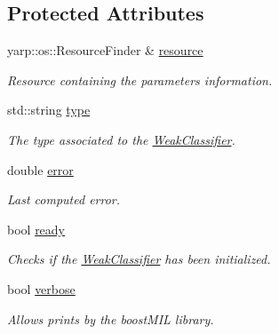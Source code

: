 \subsection*{Protected Attributes}
\begin{DoxyCompactItemize}
\item 
yarp\+::os\+::\+Resource\+Finder \& \hyperlink{classiCub_1_1boostMIL_1_1WeakClassifier_a5a7df0cc2cbb505e5b40dd59d3a4933b}{resource}\label{classiCub_1_1boostMIL_1_1WeakClassifier_a5a7df0cc2cbb505e5b40dd59d3a4933b}

\begin{DoxyCompactList}\small\item\em Resource containing the parameters information. \end{DoxyCompactList}\item 
std\+::string \hyperlink{classiCub_1_1boostMIL_1_1WeakClassifier_a6e08c26ea2e12086317d6cdd0f65bbd9}{type}\label{classiCub_1_1boostMIL_1_1WeakClassifier_a6e08c26ea2e12086317d6cdd0f65bbd9}

\begin{DoxyCompactList}\small\item\em The type associated to the \hyperlink{classiCub_1_1boostMIL_1_1WeakClassifier}{Weak\+Classifier}. \end{DoxyCompactList}\item 
double \hyperlink{classiCub_1_1boostMIL_1_1WeakClassifier_afa9e7bb9b9a92d349b40a4f127386a59}{error}\label{classiCub_1_1boostMIL_1_1WeakClassifier_afa9e7bb9b9a92d349b40a4f127386a59}

\begin{DoxyCompactList}\small\item\em Last computed error. \end{DoxyCompactList}\item 
bool \hyperlink{classiCub_1_1boostMIL_1_1WeakClassifier_a7fe5fe3366a82def4031c16a9a278350}{ready}\label{classiCub_1_1boostMIL_1_1WeakClassifier_a7fe5fe3366a82def4031c16a9a278350}

\begin{DoxyCompactList}\small\item\em Checks if the \hyperlink{classiCub_1_1boostMIL_1_1WeakClassifier}{Weak\+Classifier} has been initialized. \end{DoxyCompactList}\item 
bool \hyperlink{classiCub_1_1boostMIL_1_1WeakClassifier_a63a5602437f6936da17e33ca4d89976a}{verbose}\label{classiCub_1_1boostMIL_1_1WeakClassifier_a63a5602437f6936da17e33ca4d89976a}

\begin{DoxyCompactList}\small\item\em Allows prints by the boost\+M\+I\+L library. \end{DoxyCompactList}\end{DoxyCompactItemize}


